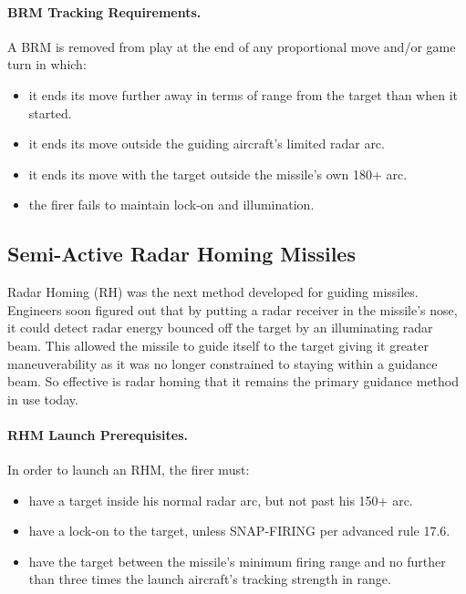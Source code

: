 \paragraph{BRM Tracking Requirements.} A BRM is removed from play at the end of any proportional move and/or game turn in which:

\begin{itemize}

    \item it ends its move further away in terms of range from the target than when it started.

    \item it ends its move outside the guiding aircraft's limited radar arc.

    \item it ends its move with the target outside the missile's own 180+ arc.

    \item the firer fails to maintain lock-on and illumination.

\end{itemize}

\subsection{Semi-Active Radar Homing Missiles}

Radar Homing (RH) was the next method developed for guiding missiles. Engineers soon figured out that by putting a radar receiver in the missile's nose, it could detect radar energy bounced off the target by an illuminating radar beam. This allowed the missile to guide itself to the target giving it greater maneuverability as it was no longer constrained to staying within a guidance beam. So effective is radar homing that it remains the primary guidance method in use today.

\paragraph{RHM Launch Prerequisites.} In order to launch an RHM, the firer must:

\begin{itemize}

    \item have a target inside his normal radar arc, but not past his 150+ arc.

    \item have a lock-on to the target, unless SNAP-FIRING per advanced rule 17.6.

    \item have the target between the missile's minimum firing range and no further than three times the launch aircraft's tracking strength in range.

\end{itemize}

